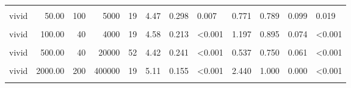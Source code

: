 \documentclass[
]{article}
\begin{document}
\begin{longtable}[t]{lrrrrrrlrrrl}
\hspace{1em}\cellcolor{gray!10}{vivid} & \cellcolor{gray!10}{50.00} & \cellcolor{gray!10}{10} & \cellcolor{gray!10}{500} & \cellcolor{gray!10}{52} & \cellcolor{gray!10}{4.25} & \cellcolor{gray!10}{0.202} & \cellcolor{gray!10}{<0.001} & \cellcolor{gray!10}{0.521} & \cellcolor{gray!10}{0.712} & \cellcolor{gray!10}{0.064} & \cellcolor{gray!10}{0.003}\\
\hspace{1em}vivid & 50.00 & 100 & 5000 & 19 & 4.47 & 0.298 & 0.007 & 0.771 & 0.789 & 0.099 & 0.019\\
\hspace{1em}\cellcolor{gray!10}{vivid} & \cellcolor{gray!10}{100.00} & \cellcolor{gray!10}{30} & \cellcolor{gray!10}{3000} & \cellcolor{gray!10}{52} & \cellcolor{gray!10}{4.08} & \cellcolor{gray!10}{0.213} & \cellcolor{gray!10}{0.009} & \cellcolor{gray!10}{0.380} & \cellcolor{gray!10}{0.654} & \cellcolor{gray!10}{0.067} & \cellcolor{gray!10}{0.036}\\
\hspace{1em}vivid & 100.00 & 40 & 4000 & 19 & 4.58 & 0.213 & <0.001 & 1.197 & 0.895 & 0.074 & <0.001\\
\hspace{1em}\cellcolor{gray!10}{vivid} & \cellcolor{gray!10}{500.00} & \cellcolor{gray!10}{10} & \cellcolor{gray!10}{5000} & \cellcolor{gray!10}{19} & \cellcolor{gray!10}{4.63} & \cellcolor{gray!10}{0.306} & \cellcolor{gray!10}{0.004} & \cellcolor{gray!10}{0.870} & \cellcolor{gray!10}{0.842} & \cellcolor{gray!10}{0.088} & \cellcolor{gray!10}{0.004}\\
\hspace{1em}vivid & 500.00 & 40 & 20000 & 52 & 4.42 & 0.241 & <0.001 & 0.537 & 0.750 & 0.061 & <0.001\\
\hspace{1em}\cellcolor{gray!10}{vivid} & \cellcolor{gray!10}{2000.00} & \cellcolor{gray!10}{20} & \cellcolor{gray!10}{40000} & \cellcolor{gray!10}{52} & \cellcolor{gray!10}{4.71} & \cellcolor{gray!10}{0.210} & \cellcolor{gray!10}{<0.001} & \cellcolor{gray!10}{0.808} & \cellcolor{gray!10}{0.827} & \cellcolor{gray!10}{0.053} & \cellcolor{gray!10}{<0.001}\\
\hspace{1em}vivid & 2000.00 & 200 & 400000 & 19 & 5.11 & 0.155 & <0.001 & 2.440 & 1.000 & 0.000 & <0.001\\
\hspace{1em}\cellcolor{gray!10}{vivid} & \cellcolor{gray!10}{10000.00} & \cellcolor{gray!10}{30} & \cellcolor{gray!10}{300000} & \cellcolor{gray!10}{19} & \cellcolor{gray!10}{5.05} & \cellcolor{gray!10}{0.254} & \cellcolor{gray!10}{<0.001} & \cellcolor{gray!10}{1.439} & \cellcolor{gray!10}{0.947} & \cellcolor{gray!10}{0.054} & \cellcolor{gray!10}{<0.001}\\

\end{longtable}
\end{document}
